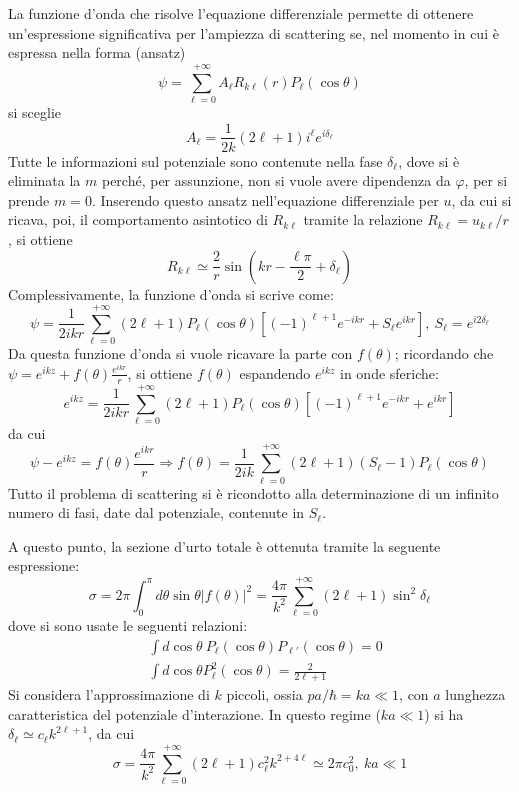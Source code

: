 \documentclass[11pt, a4paper]{scrartcl} %
\numberwithin{equation}{subsection}
\theoremstyle{style2}
\theoremstyle{style1}
\begin{document}
La funzione d'onda che risolve l'equazione differenziale permette di ottenere un'espressione significativa per l'ampiezza di scattering se, nel momento in cui \`e espressa nella forma (ansatz)
\[
\psi = \sum_{\ell =0}^{+\infty} A_\ell R_{k\ell } (r) P_\ell (\cos\theta )
\] 
si sceglie
\[
A_\ell  = \frac{1}{2k}(2\ell +1) i^{\ell } e^{i \delta _\ell } 
\] 
Tutte le informazioni sul potenziale sono contenute nella fase $\delta _\ell $, dove si \`e eliminata la $m$ perch\'e, per assunzione, non si vuole avere dipendenza da $\varphi $, per si prende $m=0$. 
Inserendo questo ansatz nell'equazione differenziale per $u$, da cui si ricava, poi, il comportamento asintotico di $R_{k\ell } $ tramite la relazione $R_{k\ell } = u_{k\ell } / r$, si ottiene
\[
R_{k\ell } \simeq \frac{2}{r} \sin \left(kr - \frac{\ell \pi}{2}+ \delta _\ell \right)  
\] 
Complessivamente, la funzione d'onda si scrive come:
\[
\psi  = \frac{1}{2ik r} \sum_{\ell =0}^{+\infty} (2\ell +1) P_\ell (\cos \theta ) \left[ (-1)^{\ell +1} e^{-ikr } + S_\ell e^{ikr }  \right] ,  \ S_\ell  = e^{i 2 \delta _\ell } 
\] 
Da questa funzione d'onda si vuole ricavare la parte con $f(\theta )$; ricordando che $\psi  = e^{ikz}  + f(\theta ) \frac{e^{ikr} }{r}$, si ottiene $f(\theta )$ espandendo $e^{ikz} $ in onde sferiche:
\[
e^{ikz}  = \frac{1}{2 ikr }\sum_{\ell =0}^{+\infty} (2\ell +1) P_\ell (\cos \theta ) \left[ (-1)^{\ell +1} e^{-ikr} + e^{ikr}  \right] 
\] 
da cui 
\[
\psi - e^{ikz} = f(\theta ) \frac{e^{ikr} }{r}\Rightarrow f(\theta ) = \frac{1}{2ik} \sum_{\ell =0}^{+\infty} (2\ell +1) (S_\ell -1) P_\ell (\cos \theta )
\] 
Tutto il problema di scattering si \`e ricondotto alla determinazione di un infinito numero di fasi, date dal potenziale, contenute in $S_\ell $.

A questo punto, la sezione d'urto totale \`e ottenuta tramite la seguente espressione:
\begin{equation}
	\sigma  = 2\pi \int_{0} ^\pi d\theta  \sin \theta \lvert f(\theta ) \rvert ^2 = \frac{4\pi}{k^2}\sum_{\ell =0}^{+\infty} (2\ell +1) \sin^2 \delta _\ell 
\end{equation}
dove si sono usate le seguenti relazioni:
\[
\begin{split}
	&\int d \cos \theta  \ P_\ell (\cos \theta ) P_{\ell '} (\cos \theta ) = 0 \\
	& \int d \cos \theta  P_\ell ^2 (\cos \theta ) = \frac{2}{2\ell +1}
\end{split}
\] 
Si considera l'approssimazione di $k$ piccoli, ossia $pa / \hbar = ka \ll 1$, con $a$ lunghezza caratteristica del potenziale d'interazione.
In questo regime ($ka \ll 1$) si ha $\delta _\ell \simeq c_\ell  k^{2\ell +1} $, da cui
\[
\sigma = \frac{4\pi}{k^2} \sum_{\ell =0}^{+\infty} (2\ell +1) c_\ell ^2 k^{2 + 4 \ell } \simeq 2\pi c_0^2, \ ka \ll 1
\] 
\end{document}
